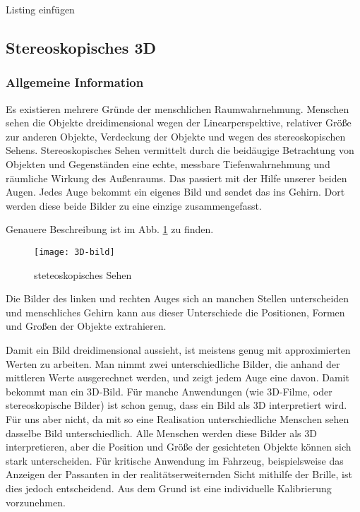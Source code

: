     Listing einfügen



\subsection{Stereoskopisches 3D}
\label{sec:Stereoskopisches 3D}
\subsubsection{Allgemeine Information}
Es existieren mehrere Gründe der menschlichen Raumwahrnehmung.
Menschen sehen die Objekte dreidimensional wegen der Linearperspektive, relativer Größe zur anderen Objekte, Verdeckung der Objekte und wegen des stereoskopischen Sehens. 
Stereoskopisches Sehen vermittelt durch die beidäugige Betrachtung von Objekten und Gegenständen eine echte, messbare Tiefenwahrnehmung und räumliche Wirkung des Außenraums. 
Das passiert mit der Hilfe unserer beiden Augen.
Jedes Auge bekommt ein eigenes Bild und sendet das ins Gehirn. 
Dort werden diese beide Bilder zu eine einzige zusammengefasst.

Genauere Beschreibung ist im Abb. \ref{fig:3D} zu finden.

\begin{figure}[h]
   \centering
   \texttt{[image: 3D-bild]}
   \caption{steteoskopisches Sehen}
   \label{fig:3D}
\end{figure}

Die Bilder des linken und rechten Auges sich an manchen Stellen unterscheiden und menschliches Gehirn kann aus dieser Unterschiede die Positionen, Formen und Großen der Objekte extrahieren.

Damit ein Bild dreidimensional aussieht, ist meistens genug mit approximierten Werten zu arbeiten.
Man nimmt zwei unterschiedliche Bilder, die anhand der mittleren Werte ausgerechnet werden, und zeigt jedem Auge eine davon. 
Damit bekommt man ein 3D-Bild. 
Für manche Anwendungen (wie 3D-Filme, oder stereoskopische Bilder) ist schon genug,  dass ein Bild als 3D interpretiert wird. 
Für uns aber nicht, da mit so eine Realisation unterschiedliche Menschen sehen dasselbe Bild unterschiedlich.
Alle Menschen werden diese Bilder als 3D interpretieren, aber die Position und Größe der gesichteten Objekte können sich stark unterscheiden. Für kritische Anwendung im Fahrzeug, beispielsweise das Anzeigen der Passanten in der realitätserweiternden Sicht mithilfe der Brille, ist dies jedoch entscheidend. Aus dem Grund ist eine individuelle Kalibrierung vorzunehmen.


